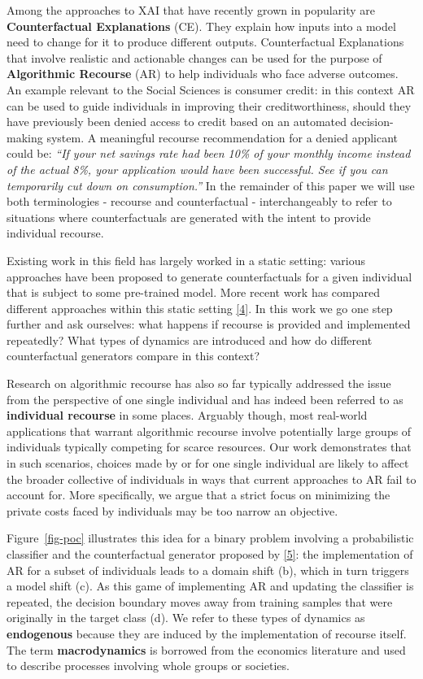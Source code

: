\documentclass[
  conference]{IEEEtran}
\begin{document}
Among the approaches to XAI that have recently grown in popularity are
\textbf{Counterfactual Explanations} (CE). They explain how inputs into
a model need to change for it to produce different outputs.
Counterfactual Explanations that involve realistic and actionable
changes can be used for the purpose of \textbf{Algorithmic Recourse}
(AR) to help individuals who face adverse outcomes. An example relevant
to the Social Sciences is consumer credit: in this context AR can be
used to guide individuals in improving their creditworthiness, should
they have previously been denied access to credit based on an automated
decision-making system. A meaningful recourse recommendation for a
denied applicant could be: \emph{``If your net savings rate had been
10\% of your monthly income instead of the actual 8\%, your application
would have been successful. See if you can temporarily cut down on
consumption.''} In the remainder of this paper we will use both
terminologies - recourse and counterfactual - interchangeably to refer
to situations where counterfactuals are generated with the intent to
provide individual recourse.

Existing work in this field has largely worked in a static setting:
various approaches have been proposed to generate counterfactuals for a
given individual that is subject to some pre-trained model. More recent
work has compared different approaches within this static setting
\protect\hyperlink{ref-pawelczyk2021carla}{{[}4{]}}. In this work we go
one step further and ask ourselves: what happens if recourse is provided
and implemented repeatedly? What types of dynamics are introduced and
how do different counterfactual generators compare in this context?

Research on algorithmic recourse has also so far typically addressed the
issue from the perspective of one single individual and has indeed been
referred to as \textbf{individual recourse} in some places. Arguably
though, most real-world applications that warrant algorithmic recourse
involve potentially large groups of individuals typically competing for
scarce resources. Our work demonstrates that in such scenarios, choices
made by or for one single individual are likely to affect the broader
collective of individuals in ways that current approaches to AR fail to
account for. More specifically, we argue that a strict focus on
minimizing the private costs faced by individuals may be too narrow an
objective.

Figure~\ref{fig-poc} illustrates this idea for a binary problem
involving a probabilistic classifier and the counterfactual generator
proposed by \protect\hyperlink{ref-wachter2017counterfactual}{{[}5{]}}:
the implementation of AR for a subset of individuals leads to a domain
shift (b), which in turn triggers a model shift (c). As this game of
implementing AR and updating the classifier is repeated, the decision
boundary moves away from training samples that were originally in the
target class (d). We refer to these types of dynamics as
\textbf{endogenous} because they are induced by the implementation of
recourse itself. The term \textbf{macrodynamics} is borrowed from the
economics literature and used to describe processes involving whole
groups or societies.
\end{document}
